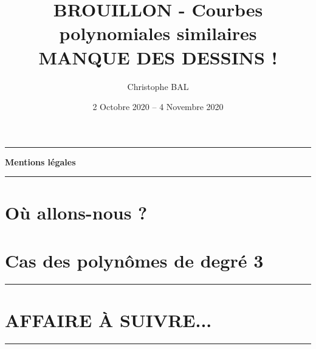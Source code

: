 \documentclass[12pt]{amsart}
\begin{document}
\title{BROUILLON - Courbes polynomiales similaires \\ MANQUE DES DESSINS !}
\author{Christophe BAL}
\date{2 Octobre 2020 -- 4 Novembre 2020}
\maketitle


\begin{center}
	\hrule\vspace{.3em}
	{
		\fontsize{1.35em}{1em}\selectfont
		\textbf{Mentions \og légales \fg}
	}
			
	\vspace{0.45em}
	\doclicenseThis
	\hrule
\end{center}



\setcounter{tocdepth}{2}
\tableofcontents




\newpage
\section{Où allons-nous ?}






\section{Cas des polynômes de degré 3} 







%

\bigskip

\hrule

\section{AFFAIRE À SUIVRE...}

\bigskip

\hrule
\end{document}
